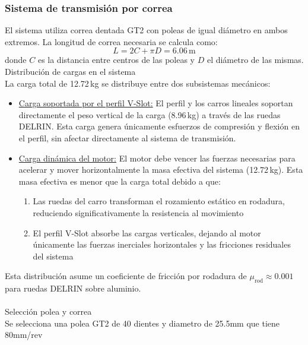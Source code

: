 \subsubsection{Sistema de transmisión por correa}
El sistema utiliza correa dentada GT2 con poleas de igual diámetro en ambos extremos. La longitud de correa necesaria se calcula como:
\begin{equation}
L = 2C + \pi D = 6.06\,\text{m}
\label{eq:longitud_correa}
\end{equation}
donde $C$ es la distancia entre centros de las poleas y $D$ el diámetro de las mismas. \\

Distribución de cargas en el sistema\\
\noindent
La carga total de 12.72\,kg se distribuye entre dos subsistemas mecánicos:

\begin{itemize}[label=$\bullet$]
    \item \underline{Carga soportada por el perfil V-Slot:} El perfil y los carros lineales soportan directamente el peso vertical de la carga (8.96\,kg) a través de las ruedas DELRIN. Esta carga genera únicamente esfuerzos de compresión y flexión en el perfil, sin afectar directamente al sistema de transmisión.
    
    \item \underline{Carga dinámica del motor:} El motor debe vencer las fuerzas necesarias para acelerar y mover horizontalmente la masa efectiva del sistema (12.72\,kg). Esta masa efectiva es menor que la carga total debido a que:
    \begin{enumerate}
        \item Las ruedas del carro transforman el rozamiento estático en rodadura, reduciendo significativamente la resistencia al movimiento
        \item El perfil V-Slot absorbe las cargas verticales, dejando al motor únicamente las fuerzas inerciales horizontales y las fricciones residuales del sistema
    \end{enumerate}
\end{itemize}

Esta distribución asume un coeficiente de fricción por rodadura de $\mu_{\text{rod}} \approx 0.001$ para ruedas DELRIN sobre aluminio.\\ \\
Selección polea y correa\\
\noindent
Se selecciona una polea GT2 de 40 dientes y diametro de 25.5mm que tiene 80mm/rev

